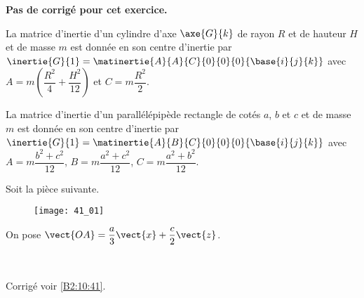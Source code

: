 \normaltrue \difficilefalse \tdifficilefalse
\correctionfalse


\setcounter{numques}{0}
\ifcorrection
\else
\textbf{Pas de corrigé pour cet exercice.}
\fi

\ifprof
\else
La matrice d'inertie d'un cylindre d'axe $\axe{G}{k}$ de rayon $R$ et de hauteur $H$ et de masse $m$ est donnée en son centre d'inertie par 
$\inertie{G}{1}=\matinertie{A}{A}{C}{0}{0}{0}{\base{i}{j}{k}}$ avec $A=m\left(\dfrac{R^2}{4}+\dfrac{H^2}{12} \right)$ et $C=m\dfrac{R^2}{2}$. 


La matrice d'inertie d'un parallélépipède rectangle de cotés $a$, $b$ et $c$ et de masse $m$ est donnée en son centre d'inertie par 
$\inertie{G}{1}=\matinertie{A}{B}{C}{0}{0}{0}{\base{i}{j}{k}}$ avec $A={m\dfrac{b^2+c^2}{12}}$, $B={m\dfrac{a^2+c^2}{12}}$, $C={m\dfrac{a^2+b^2}{12}}$.

Soit la pièce suivante. 
\begin{figure}[H]
\centering
\texttt{[image: 41\_01]}
\end{figure}

On pose $\vect{OA}=\dfrac{a}{3}\vect{x}+\dfrac{c}{2}\vect{z}$. 

\fi



\ifprof
\else
\fi

\ifprof ~\\
%
%
%
\else
\fi


\ifprof
\else
\begin{flushright}
\footnotesize{Corrigé voir \ref{B2:10:41}.}
\end{flushright}%
\fi